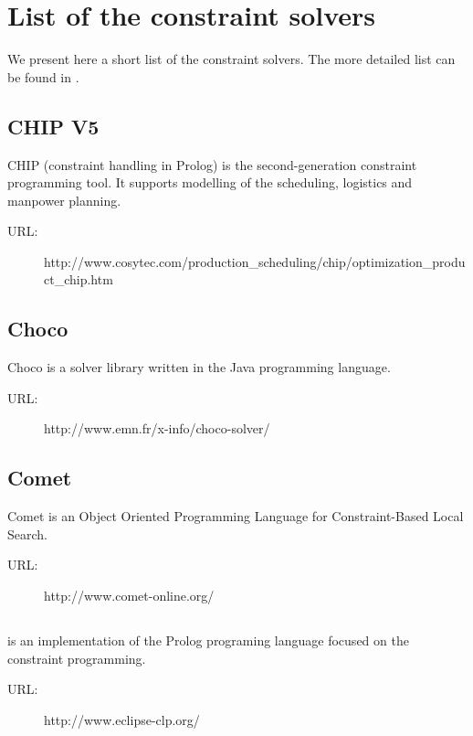 \chapter{List of the constraint solvers}
\label{list-of-solvers}

We present here a short list of the constraint solvers. The more detailed list can be
found in \cite{bartak:los}.

\section*{CHIP V5}
CHIP (constraint handling in Prolog) is the second-generation constraint programming 
tool. It supports modelling of the scheduling, logistics and manpower planning. 

\begin{description}
	\item[URL:] http://www.cosytec.com/pro\-duction\_sche\-duling/chip/opti\-miza\-tion\_pro\-duct\_chip.htm
\end{description}  

\section*{Choco}
Choco is a solver library written in the Java programming language.

\begin{description}
	\item[URL:] http://www.emn.fr/x-info/choco-solver/	
\end{description}  

\section*{Comet}
Comet is an Object Oriented Programming Language for Constraint-Based Local Search.

\begin{description}
	\item[URL:] http://www.comet-online.org/
\end{description} 

\section*{\eclipse}
\eclipse is an implementation of the Prolog programing language focused on the constraint 
programming. 

\begin{description}
	\item[URL:] http://www.eclipse-clp.org/
\end{description}  

